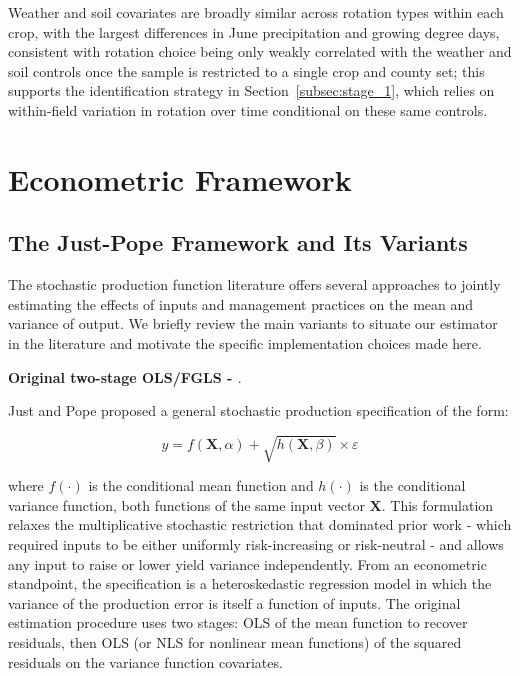 \documentclass[12pt,letterpaper]{article}
\theoremstyle{remark}
\theoremstyle{remark}
\theoremstyle{plain}
\theoremstyle{definition}
\begin{document}
Weather and soil covariates are broadly similar across rotation types within each crop, with the largest differences in June precipitation and growing degree days, consistent with rotation choice being only weakly correlated with the weather and soil controls once the sample is restricted to a single crop and county set; this supports the identification strategy in Section~\ref{subsec:stage_1}, which relies on within-field variation in rotation over time conditional on these same controls.
	
\section{Econometric Framework\label{sec:econ_framework}}
\subsection{\label{subsec:just_pope}The Just-Pope Framework and Its Variants}
The stochastic production function literature offers several approaches to jointly estimating the effects of inputs and management practices on the mean and variance of output. We briefly review the main variants to situate our estimator in the literature and motivate the specific implementation choices made here.

\medskip\noindent\textbf{Original two-stage OLS/FGLS - \cite{Just1978, Just1979}}. 

Just and Pope proposed a general stochastic production specification of the form:

\begin{equation}
    y = f(\mathbf{X},\alpha)+\sqrt{h(\mathbf{X},\beta)}\times \varepsilon
\end{equation}

where $f(\cdot)$ is the conditional mean function and $h(\cdot)$ is the conditional variance function, both functions of the same input vector $\mathbf{X}$. This formulation relaxes the multiplicative stochastic restriction that dominated prior work - which
required inputs to be either uniformly risk-increasing or risk-neutral - and allows any input to raise or lower yield variance independently. From an econometric standpoint, the specification is a heteroskedastic regression model in which the variance of the production error is itself a function of inputs. The original estimation procedure uses two stages: OLS of the mean function to recover residuals, then OLS (or NLS for nonlinear mean functions) of the squared residuals on the variance function covariates.
\end{document}

